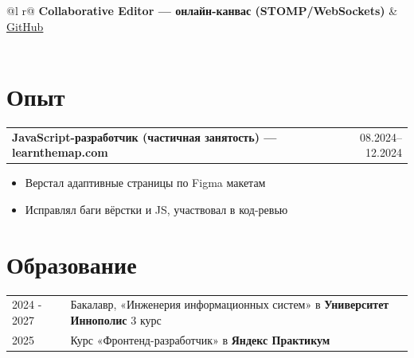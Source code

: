 \documentclass[a4paper,12pt]{article}
\makeatletter
\newenvironment{joblong}[2]
    {
    \begin{tabularx}{\linewidth}{@{}l X r@{}}
    \textbf{#1} & \hfill &  #2 \\[3.75pt]
    \end{tabularx}
    \begin{minipage}[t]{\linewidth}
    \begin{itemize}[nosep,after=\strut, leftmargin=1em, itemsep=3pt,label=--]
    }
    {
    \end{itemize}
    \end{minipage}    
    }
\makeatother
\begin{document}
\begin{tabularx}{\linewidth}{ @{}l r@{} }
\textbf{Collaborative Editor — онлайн-канвас (STOMP/WebSockets)} & \hfill \href{https://github.com/samerspc/collaborative_editor}{GitHub} \\[-8pt]
  \\
\end{tabularx}

\section{Опыт}

\begin{joblong}{JavaScript-разработчик (частичная занятость) — learnthemap.com}{08.2024–12.2024}
\item Верстал адаптивные страницы по Figma макетам
\item Исправлял баги вёрстки и JS, участвовал в код-ревью
\end{joblong}

\section{Образование}
\begin{tabularx}{\linewidth}{@{}l X@{}}	
2024 - 2027 & Бакалавр, «Инженерия информационных систем» в \textbf{Университет Иннополис} \hfill \small{3 курс} \\
2025 & Курс «Фронтенд-разработчик» в \textbf{Яндекс Практикум} \\
\end{tabularx}

\end{document}
